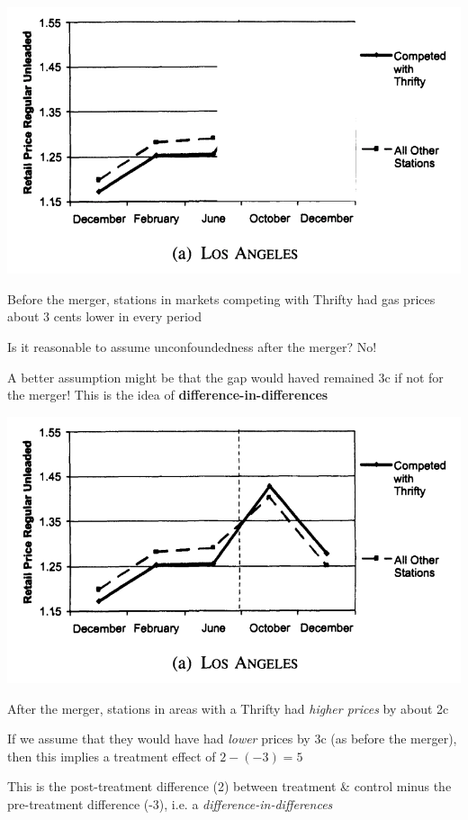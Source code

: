 \documentclass[11pt,english,handout]{beamer}
\newenvironment{wideitemize}{\itemize\addtolength{\itemsep}{10pt}}{\enditemize}
\begin{document}
\begin{frame}
	\includegraphics[width=0.7\linewidth]{hastings-event-study-pre}
	\begin{wideitemize}
		\item
		Before the merger, stations in markets competing with Thrifty had gas prices about 3 cents lower in every period
		
		\pause
		\item
		Is it reasonable to assume unconfoundedness after the merger? \pause No!
		
		\pause
		\item
		A better assumption might be that the gap would haved remained 3c if not for the merger! \pause{} This is the idea of \textbf{difference-in-differences}
	\end{wideitemize}
\end{frame}

\begin{frame}
	\includegraphics[width=0.7\linewidth]{hastings-event-study}

	\begin{wideitemize}
		\item
		After the merger, stations in areas with a Thrifty had \textit{higher prices} by about 2c
		
		\pause
		\item
		If we assume that they would have had \textit{lower} prices by 3c (as before the merger), then this implies a treatment effect of \pause{} $2 - (-3) = 5$ 
		
		\pause
		\item
		This is the post-treatment difference (2) between treatment \& control minus the pre-treatment difference (-3), i.e. a \textit{difference-in-differences}
	\end{wideitemize}

\end{frame}
\end{document}
